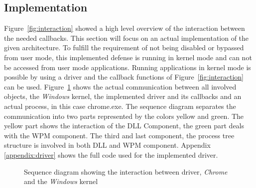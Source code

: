 \subsection{Implementation}
\label{sec:implementation} 
Figure~\ref{fig:interaction} showed a high level overview of the interaction between the needed callbacks. This section will focus on an actual implementation of the given architecture. To fulfill the requirement of not being disabled or bypassed from user mode, this implemented defense is running in kernel mode and can not be accessed from user mode applications. Running applications in kernel mode is possible by using a driver and the callback functions of Figure~\ref{fig:interaction} can be used. Figure~\ref{fig:sequence} shows the actual communication between all involved objects, the \emph{Windows} kernel, the implemented driver and its callbacks and an actual process, in this case chrome.exe. The sequence diagram separates the communication into two parts represented by the colors yellow and green. The yellow part shows the interaction of the \gls{DLL} Component, the green part deals with the \gls{WPM} component. The third and last component, the process tree structure is involved in both \gls{DLL} and \gls{WPM} component. Appendix \ref{appendix:driver} shows the full code used for the implemented driver.
\pagestyle{empty}
\begin{figure}[!p] 
 \centering
\caption{Sequence diagram showing the interaction between driver, \emph{Chrome} and the \emph{Windows} kernel}
\label{fig:sequence}
\end{figure}
\restoregeometry
\pagestyle{plain}
